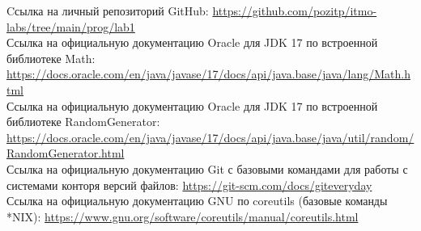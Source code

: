 \begin{thebibliography}{}
     Cсылка на личный репозиторий GitHub: \url{https://github.com/pozitp/itmo-labs/tree/main/prog/lab1}\\
     Ссылка на официальную документацию Oracle для JDK 17 по встроенной библиотеке Math: \url{https://docs.oracle.com/en/java/javase/17/docs/api/java.base/java/lang/Math.html}\\
     Ссылка на официальную документацию Oracle для JDK 17 по встроенной библиотеке RandomGenerator: \url{https://docs.oracle.com/en/java/javase/17/docs/api/java.base/java/util/random/RandomGenerator.html}\\
     Ссылка на официальную документацию Git с базовыми командами для работы с системами конторя версий файлов: \url{https://git-scm.com/docs/giteveryday}\\
     Ссылка на официальную документацию GNU по coreutils (базовые команды *NIX): \url{https://www.gnu.org/software/coreutils/manual/coreutils.html}\\
\end{thebibliography}